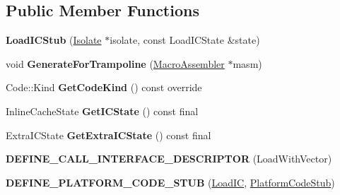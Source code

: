 \subsection*{Public Member Functions}
\begin{DoxyCompactItemize}
\item 
{\bfseries Load\+I\+C\+Stub} (\hyperlink{classv8_1_1internal_1_1_isolate}{Isolate} $\ast$isolate, const Load\+I\+C\+State \&state)\hypertarget{classv8_1_1internal_1_1_load_i_c_stub_ac1f1fa24cd892e2c60d172b1a019583a}{}\label{classv8_1_1internal_1_1_load_i_c_stub_ac1f1fa24cd892e2c60d172b1a019583a}

\item 
void {\bfseries Generate\+For\+Trampoline} (\hyperlink{classv8_1_1internal_1_1_macro_assembler}{Macro\+Assembler} $\ast$masm)\hypertarget{classv8_1_1internal_1_1_load_i_c_stub_aa19424ab42dba051d70d939d18f7b06e}{}\label{classv8_1_1internal_1_1_load_i_c_stub_aa19424ab42dba051d70d939d18f7b06e}

\item 
Code\+::\+Kind {\bfseries Get\+Code\+Kind} () const  override\hypertarget{classv8_1_1internal_1_1_load_i_c_stub_a430cfe6f0841e25c13ab56217c2c28a7}{}\label{classv8_1_1internal_1_1_load_i_c_stub_a430cfe6f0841e25c13ab56217c2c28a7}

\item 
Inline\+Cache\+State {\bfseries Get\+I\+C\+State} () const  final\hypertarget{classv8_1_1internal_1_1_load_i_c_stub_a2cbbfc9042cc911339a683d3830c257d}{}\label{classv8_1_1internal_1_1_load_i_c_stub_a2cbbfc9042cc911339a683d3830c257d}

\item 
Extra\+I\+C\+State {\bfseries Get\+Extra\+I\+C\+State} () const  final\hypertarget{classv8_1_1internal_1_1_load_i_c_stub_a5b9cb0fd2f3c9ada87f8fe1a099f351c}{}\label{classv8_1_1internal_1_1_load_i_c_stub_a5b9cb0fd2f3c9ada87f8fe1a099f351c}

\item 
{\bfseries D\+E\+F\+I\+N\+E\+\_\+\+C\+A\+L\+L\+\_\+\+I\+N\+T\+E\+R\+F\+A\+C\+E\+\_\+\+D\+E\+S\+C\+R\+I\+P\+T\+OR} (Load\+With\+Vector)\hypertarget{classv8_1_1internal_1_1_load_i_c_stub_a4fb4e3fdcbd9f6ed4e7107824e58f7b0}{}\label{classv8_1_1internal_1_1_load_i_c_stub_a4fb4e3fdcbd9f6ed4e7107824e58f7b0}

\item 
{\bfseries D\+E\+F\+I\+N\+E\+\_\+\+P\+L\+A\+T\+F\+O\+R\+M\+\_\+\+C\+O\+D\+E\+\_\+\+S\+T\+UB} (\hyperlink{classv8_1_1internal_1_1_load_i_c}{Load\+IC}, \hyperlink{classv8_1_1internal_1_1_platform_code_stub}{Platform\+Code\+Stub})\hypertarget{classv8_1_1internal_1_1_load_i_c_stub_a48c8edf1f8ea671b04d54e68ee896d25}{}\label{classv8_1_1internal_1_1_load_i_c_stub_a48c8edf1f8ea671b04d54e68ee896d25}

\end{DoxyCompactItemize}
